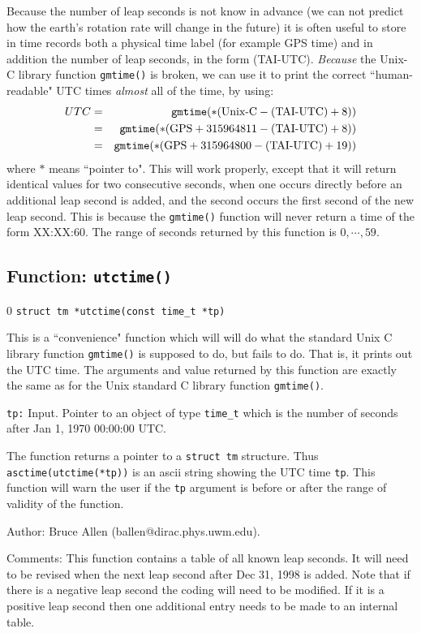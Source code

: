 Because the number of leap seconds is not know in advance (we can not
predict how the earth's rotation rate will change in the future) it is
often useful to store in time records both a physical time label (for
example GPS time) and in addition the number of leap seconds, in the form
(TAI-UTC).   {\it Because} the Unix-C library function {\tt gmtime()}
is broken, we can use it to print the correct ``human-readable" UTC
times {\it almost} all of the time, by using:
\begin{eqnarray}
\nonumber
UTC &=&  {\tt gmtime}(*(\textrm{Unix-C} - (\textrm{TAI-UTC}) +8)) \\
\nonumber
         &=&  {\tt gmtime}(*(\textrm{GPS}+315964811 - (\textrm{TAI-UTC}) + 8)) \\
         &=&  {\tt gmtime}(*(\textrm{GPS}+315964800 - (\textrm{TAI-UTC}) + 19))
\end{eqnarray}
where $*$ means ``pointer to".  This will work properly, except that it
will return identical values for two consecutive seconds, when one occurs
directly before an additional leap second is added, and the second occurs
the first second of the new leap second.  This is because the {\tt gmtime()}
function will never return a time of the form XX:XX:60.  The range of seconds
returned by this function is $0,\cdots,59$.

\clearpage
\subsection{Function: {\tt utctime()} }
\setcounter{equation}0
{\tt struct tm *utctime(const time\_t *tp) }

This is a ``convenience" function which will will do what the standard
Unix C library function {\tt gmtime()} is supposed to do, but fails to do.
That is, it prints out the UTC time.  The arguments and value returned by
this function are exactly the same as for the Unix standard C library function
{\tt gmtime()}.

\begin{description}
\item{\tt tp:} Input.  Pointer to an object of type {\tt time\_t} which is the number
of seconds after Jan 1, 1970 00:00:00 UTC.
\end{description}
The function returns a pointer to a {\tt struct tm} structure.  Thus {\tt
asctime(utctime(*tp))} is an ascii string showing the UTC time {\tt tp}.
This function will warn the user if the {\tt tp} argument is before or
after the range of validity of the function.
\begin{description}
\item{Author:}
Bruce Allen (ballen@dirac.phys.uwm.edu).
\item{Comments:}
This function contains a table of all known leap seconds.  It will need
to be revised when the next leap second after Dec 31, 1998 is added.
Note that if there is a negative leap second the coding will need to
be modified.  If it is a positive leap second then one additional entry
needs to be made to an internal table.
\end{description}


